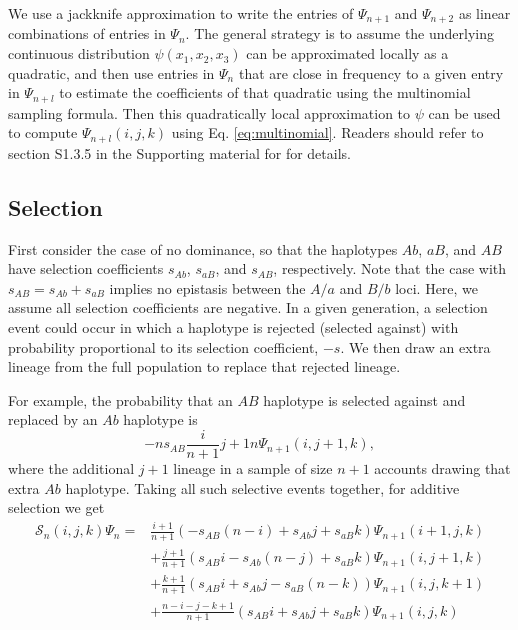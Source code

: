\documentclass[]{article}
\begin{document}
We use a jackknife approximation to write the entries of \(\Psi_{n+1}\) and
\(\Psi_{n+2}\) as linear combinations of entries in \(\Psi_n\). The general
strategy is to assume the underlying continuous distribution \(\psi(x_1, x_2, x_3)\) can be approximated locally as a quadratic, and then use entries in
\(\Psi_n\) that are close in frequency to a given entry in \(\Psi_{n+l}\) to
estimate the coefficients of that quadratic using the multinomial sampling
formula. Then this quadratically local approximation to \(\psi\) can be used to
compute \(\Psi_{n+l}(i, j, k)\) using Eq. \eqref{eq:multinomial}. Readers should
refer to section S1.3.5 in the Supporting material for \citet{Ragsdale2019-nt} for
details.

\subsection{Selection}\label{selection}

First consider the case of no dominance, so that the haplotypes \(Ab\), \(aB\),
and \(AB\) have selection coefficients \(s_{Ab}\), \(s_{aB}\), and \(s_{AB}\),
respectively. Note that the case with \(s_{AB} = s_{Ab} + s_{aB}\) implies no
epistasis between the \(A/a\) and \(B/b\) loci. Here, we assume all selection
coefficients are negative. In a given generation, a selection event could
occur in which a haplotype is rejected (selected against) with probability
proportional to its selection coefficient, \(-s\). We then draw an extra lineage
from the full population to replace that rejected lineage.

For example, the probability that an \(AB\) haplotype is selected against and
replaced by an \(Ab\) haplotype is \[-ns_{AB} \frac{i}{n+1}{j+1}{n}\Psi_{n+1}(i,
j + 1, k),\] where the additional \(j + 1\) lineage in a sample of size \(n + 1\)
accounts drawing that extra \(Ab\) haplotype. Taking all such selective events
together, for additive selection we get
\begin{align}
\mathcal{S}_{n}(i, j, k)\Psi_n = &
\frac{i+1}{n+1}\left(-s_{AB}(n-i) + s_{Ab}j
+ s_{aB}k\right)\Psi_{n+1}(i+1, j, k) \\\nonumber
& +\frac{j+1}{n+1}\left(s_{AB}i - s_{Ab}(n-j)
+ s_{aB}k\right)\Psi_{n+1}(i, j+1, k) \\\nonumber
& +\frac{k+1}{n+1}\left(s_{AB}i + s_{Ab}j
- s_{aB}(n-k)\right)\Psi_{n+1}(i, j, k+1) \\\nonumber
& + \frac{n-i-j-k+1}{n+1}\left(s_{AB}i + s_{Ab}j
+ s_{aB}k\right)\Psi_{n+1}(i, j, k)
\end{align}
\end{document}

